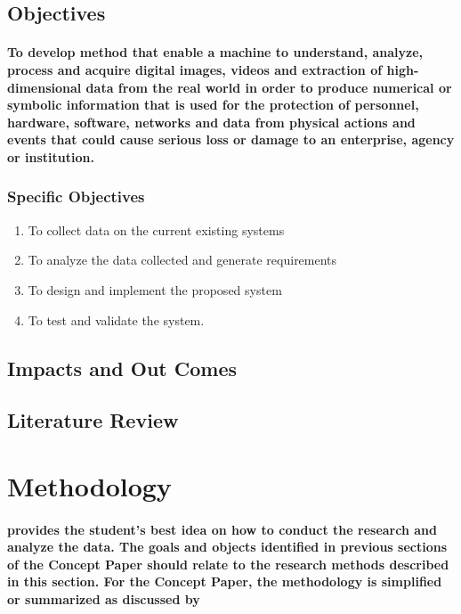 \documentclass[11pt]{article}
\begin{document}
	 \subsection{\textbf{Objectives}}
	 
	   \paragraph{\textmd{To develop method that enable a machine to understand, analyze, process and acquire digital images, videos and extraction of high-dimensional data from the real world in order to produce numerical or symbolic information that is used for the protection of personnel, hardware, software, networks and data from physical actions and events that could cause serious loss or damage to an enterprise, agency or institution.}}
	   
	   \subsubsection{\textbf{Specific Objectives}}
	   
	   \begin{enumerate}
	   
	   \item To collect data on the current existing systems
	   \item To analyze the data collected and generate requirements
	   \item To design and implement the proposed system 
	   \item To test and validate the system.
	           
	   \end{enumerate} 	  

	   \subsection{\textbf{Impacts and Out Comes}}
	   \subsection{\textbf{Literature Review}}
	   
	   \section{\textbf{Methodology}}
	   \paragraph{\textmd{provides the student’s best idea on how to conduct the research and analyze the data. The goals and objects identified in previous sections of the Concept Paper should relate to the research methods described in this section.  For the Concept Paper, the methodology is simplified or summarized as discussed by }}
	   
	
    	
    	 
       
\end{document}
